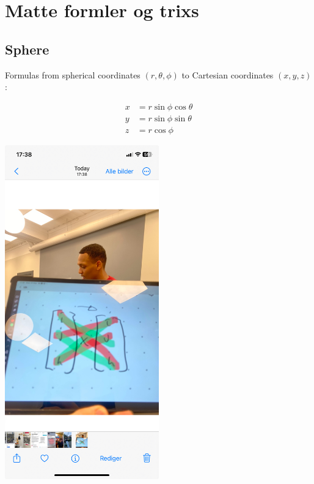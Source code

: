 \section{Matte formler og trixs}

\subsection{Sphere}
Formulas from spherical coordinates \((r, \theta, \phi)\) to Cartesian coordinates \((x, y, z)\):

\begin{align*}
x &= r \sin\phi \cos\theta \\
y &= r \sin\phi \sin\theta \\
z &= r \cos\phi
\end{align*}

\includegraphics[width=0.5\textwidth]{figures/cross.jpeg}
